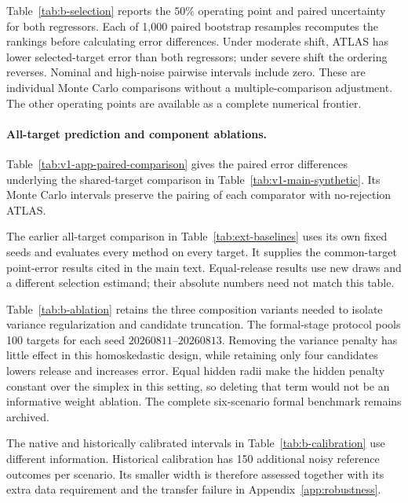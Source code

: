 Table~\ref{tab:b-selection} reports the $50\%$ operating point and paired uncertainty for both regressors. Each of 1,000 paired bootstrap resamples recomputes the rankings before calculating error differences. Under moderate shift, ATLAS has lower selected-target error than both regressors; under severe shift the ordering reverses. Nominal and high-noise pairwise intervals include zero. These are individual Monte Carlo comparisons without a multiple-comparison adjustment. The other operating points are available as a complete numerical frontier.


\paragraph{All-target prediction and component ablations.}
Table~\ref{tab:v1-app-paired-comparison} gives the paired error differences underlying the shared-target comparison in Table~\ref{tab:v1-main-synthetic}. Its Monte Carlo intervals preserve the pairing of each comparator with no-rejection ATLAS.


The earlier all-target comparison in Table~\ref{tab:ext-baselines} uses its own fixed seeds and evaluates every method on every target. It supplies the common-target point-error results cited in the main text. Equal-release results use new draws and a different selection estimand; their absolute numbers need not match this table.


Table~\ref{tab:b-ablation} retains the three composition variants needed to isolate variance regularization and candidate truncation. The formal-stage protocol pools 100 targets for each seed $20260811$--$20260813$. Removing the variance penalty has little effect in this homoskedastic design, while retaining only four candidates lowers release and increases error. Equal hidden radii make the hidden penalty constant over the simplex in this setting, so deleting that term would not be an informative weight ablation. The complete six-scenario formal benchmark remains archived.


The native and historically calibrated intervals in Table~\ref{tab:b-calibration} use different information. Historical calibration has 150 additional noisy reference outcomes per scenario. Its smaller width is therefore assessed together with its extra data requirement and the transfer failure in Appendix~\ref{app:robustness}.

